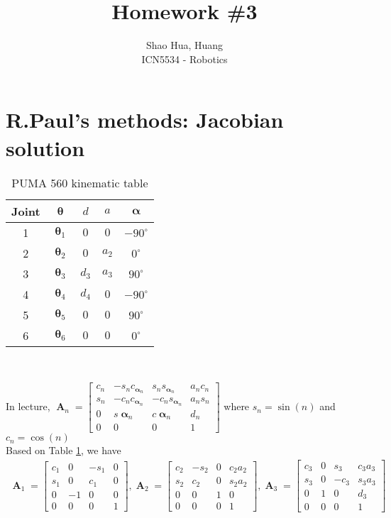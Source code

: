 \documentclass[12pt]{article}
\title{Homework \#3}
\author{Shao Hua, Huang\\
ICN5534 - Robotics}
\DeclareMathOperator{\A}{\mathbf{A}}
\DeclareMathOperator{\al}{\mathbf{\alpha}}
\DeclareMathOperator{\Th}{\mathbf{\theta}}
\begin{document}
\maketitle
\section{R.Paul's methods: Jacobian solution}
  \begin{table}[h]
    \centering
    \begin{tabular}[l]{ccccc}    
      \hline
      Joint & $\Th$ & $d$ & $a$ & $\al$ \\\hline
      1 & $\Th_1$ & $0$ & $0$ & $-90^\circ$ \\\hline
      2 & $\Th_2$ & $0$ & $a_2$ & $0^\circ$ \\\hline
      3 & $\Th_3$ & $d_3$ & $a_3$ & $90^\circ$ \\\hline
      4 & $\Th_4$ & $d_4$ & $0$ & $-90^\circ$ \\\hline
      5 & $\Th_5$ & $0$ & $0$ & $90^\circ$ \\\hline
      6 & $\Th_6$ & $0$ & $0$ & $0^\circ$ \\\hline
    \end{tabular}\\
    \caption{PUMA 560 kinematic table}\label{table1}
  \end{table}
  In lecture, $\A_n =
  \begin{bmatrix}
  c_n & -s_nc_{\al_n} &  s_ns_{\al_n} & a_nc_n\\
  s_n & -c_nc_{\al_n} & -c_ns_{\al_n} & a_ns_n\\
  0 & s\al_n & c\al_n & d_n\\
  0 & 0 & 0 & 1
  \end{bmatrix}$ where $s_n = \sin(n)$ and $c_n = \cos(n)$\\
  Based on Table \ref{table1}, we have
  \begin{align*}
    \A_1 =
    \begin{bmatrix}
      c_1 & 0 & -s_1 & 0\\
      s_1 & 0 & c_1 & 0\\
      0 & -1 & 0 & 0\\
      0 & 0 & 0 & 1
    \end{bmatrix},
    \A_2 =
    \begin{bmatrix}
      c_2 & -s_2 & 0 & c_2a_2\\
      s_2 & c_2 & 0 & s_2a_2\\
      0 & 0 & 1 & 0\\
      0 & 0 & 0 & 1
    \end{bmatrix},
    \A_3 =
    \begin{bmatrix}
      c_3 & 0 & s_3 & c_3a_3\\
      s_3 & 0 & -c_3 & s_3a_3\\
      0 & 1 & 0 & d_3\\
      0 & 0 & 0 & 1
    \end{bmatrix}
  \end{align*}
\end{document}
